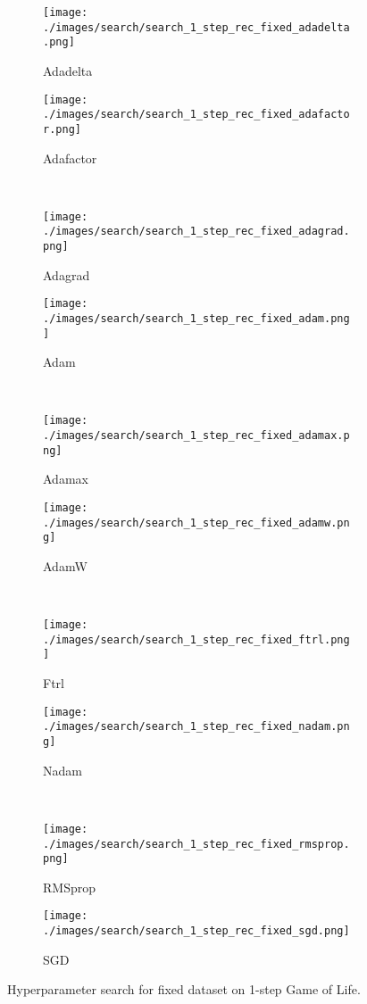 \documentclass[letterpaper]{article} %
\begin{document}
\clearpage
\begin{figure*}[ht!]
    \centering
    \begin{subfigure}{.49\linewidth}
        \texttt{[image: ./images/search/search\_1\_step\_rec\_fixed\_adadelta.png]}
        \caption{Adadelta}
    \end{subfigure}
    \begin{subfigure}{.49\linewidth}
        \texttt{[image: ./images/search/search\_1\_step\_rec\_fixed\_adafactor.png]}
        \caption{Adafactor}
    \end{subfigure}
    \\
    \begin{subfigure}{.49\linewidth}
        \texttt{[image: ./images/search/search\_1\_step\_rec\_fixed\_adagrad.png]}
        \caption{Adagrad}
    \end{subfigure}
    \begin{subfigure}{.49\linewidth}
        \texttt{[image: ./images/search/search\_1\_step\_rec\_fixed\_adam.png]}
        \caption{Adam}
    \end{subfigure}
    \\
    \begin{subfigure}{.49\linewidth}
        \texttt{[image: ./images/search/search\_1\_step\_rec\_fixed\_adamax.png]}
        \caption{Adamax}
    \end{subfigure}
    \begin{subfigure}{.49\linewidth}
        \texttt{[image: ./images/search/search\_1\_step\_rec\_fixed\_adamw.png]}
        \caption{AdamW}
    \end{subfigure}
    \\
    \begin{subfigure}{.49\linewidth}
        \texttt{[image: ./images/search/search\_1\_step\_rec\_fixed\_ftrl.png]}
        \caption{Ftrl}
    \end{subfigure}
    \begin{subfigure}{.49\linewidth}
        \texttt{[image: ./images/search/search\_1\_step\_rec\_fixed\_nadam.png]}
        \caption{Nadam}
    \end{subfigure}
    \\
    \begin{subfigure}{.49\linewidth}
        \texttt{[image: ./images/search/search\_1\_step\_rec\_fixed\_rmsprop.png]}
        \caption{RMSprop}
    \end{subfigure}
    \begin{subfigure}{.49\linewidth}
        \texttt{[image: ./images/search/search\_1\_step\_rec\_fixed\_sgd.png]}
        \caption{SGD}
    \end{subfigure}
    \caption{Hyperparameter search for fixed dataset on 1-step Game of Life.}
    \label{fig:search_1_fixed}
\end{figure*}
\end{document}
